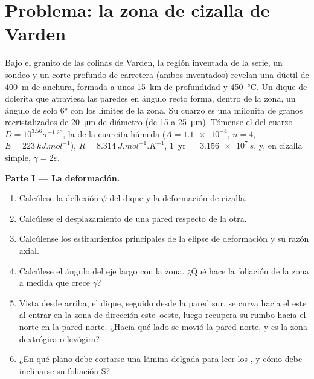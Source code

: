 \section{Problema: la zona de cizalla de Varden}

\begin{problem}
\label{pb:b3:deformation-mechanisms:1}
Bajo el granito de las colinas de Varden, la región inventada de la serie, un sondeo y
un corte profundo de carretera (ambos inventados) revelan una  dúctil de
\qty{400}{m} de anchura, formada a unos \qty{15}{km} de profundidad y \qty{450}{\celsius}.
Un dique de dolerita que atraviesa las paredes en ángulo recto forma, dentro de la zona,
un ángulo de solo \ang{6} con los límites de la zona. Su cuarzo es una milonita de granos
recristalizados de \qty{20}{\micro m} de diámetro (de 15 a
\qty{25}{\micro m}). Tómense el  del cuarzo $D = 10^{3.56}\sigma^{-1.26}$,
la  de la cuarcita húmeda ($A = \num{1.1e-4}$, $n = 4$, $E =
\qty{223}{kJ.mol^{-1}}$), $R = \qty{8.314}{J.mol^{-1}.K^{-1}}$, \qty{1}{yr} $=
\qty{3.156e7}{s}$, y, en cizalla simple, $\dot\gamma = 2\dot\varepsilon$.

\medskip\noindent\textbf{Parte I --- La deformación.}
\begin{enumerate}
  \item Calcúlese la deflexión $\psi$ del dique y la deformación de cizalla.
  \item Calcúlese el desplazamiento de una pared respecto de la otra.
  \item Calcúlense los estiramientos principales de la elipse de deformación y su
        razón axial.
  \item Calcúlese el ángulo del eje largo con la zona. ¿Qué hace la
        foliación de la zona a medida que crece $\gamma$?
  \item Vista desde arriba, el dique, seguido desde la pared sur, se curva hacia el
        este al entrar en la zona de dirección este--oeste, luego recupera su
        rumbo hacia el norte en la pared norte. ¿Hacia qué lado se movió la
        pared norte, y es la zona dextrógira o levógira?
  \item ¿En qué plano debe cortarse una lámina delgada para leer los , y cómo debe inclinarse su foliación S?
\end{enumerate}


\end{problem}
